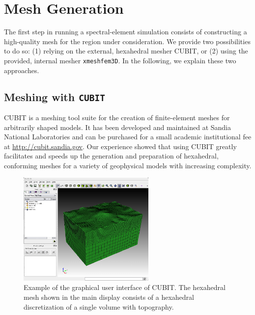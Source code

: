 \chapter{Mesh Generation}\label{cha:Mesh-Generation}

The first step in running a spectral-element simulation consists of
constructing a high-quality mesh for the region under consideration.
We provide two possibilities to do so: (1) relying on the external,
hexahedral mesher CUBIT, or (2) using the provided, internal mesher
\texttt{xmeshfem3D}. In the following, we explain these two approaches.


\section{Meshing with \texttt{CUBIT}}\label{cha:Running-the-Mesher-CUBIT}

CUBIT is a meshing tool suite for the creation of finite-element meshes
for arbitrarily shaped models. It has been developed and maintained
at Sandia National Laboratories and can be purchased for a small academic
institutional fee at \url{http://cubit.sandia.gov}. Our experience
showed that using CUBIT greatly facilitates and speeds up the generation
and preparation of hexahedral, conforming meshes for a variety of
geophysical models with increasing complexity.

\begin{figure}[htbp]
\begin{centering}
\includegraphics[width=0.6\textwidth]{figures/mount-cubit.jpg}
\par
\end{centering}
\caption{Example of the graphical user interface of CUBIT. The hexahedral mesh
shown in the main display consists of a hexahedral discretization
of a single volume with topography.}
\label{fig:mount.cubit}
\end{figure}

